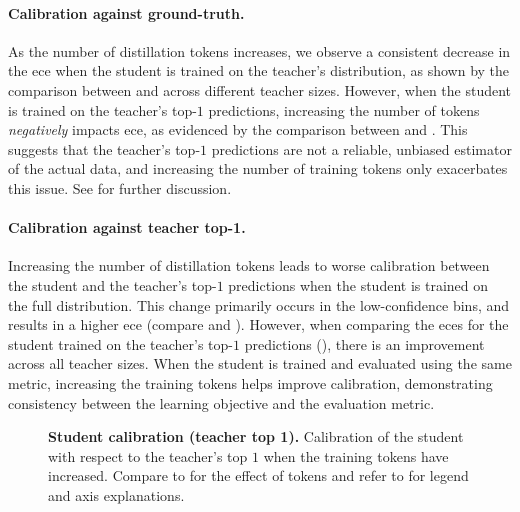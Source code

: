 \paragraph{Calibration against ground-truth.} 
As the number of distillation tokens increases, we observe a consistent decrease in the \gls{ece} when the student is trained on the teacher's distribution, as shown by the comparison between  and  across different teacher sizes. 
However, when the student is trained on the teacher's top-$1$ predictions, increasing the number of tokens \emph{negatively} impacts \gls{ece}, as evidenced by the comparison between  and . 
This suggests that the teacher's top-$1$ predictions are not a reliable, unbiased estimator of the actual data, and increasing the number of training tokens only exacerbates this issue. See  for further discussion.

\paragraph{Calibration against teacher top-1.} 
Increasing the number of distillation tokens leads to worse calibration between the student and the teacher's top-$1$ predictions when the student is trained on the full distribution. 
This change primarily occurs in the low-confidence bins, and results in a higher \gls{ece} (compare  and ). 
However, when comparing the \gls{ece}s for the student trained on the teacher's top-$1$ predictions (), there is an improvement across all teacher sizes. 
When the student is trained and evaluated using the same metric, increasing the training tokens helps improve calibration, demonstrating consistency between the learning objective and the evaluation metric.

\begin{figure}[h]
  \centering
  \hfill
  \caption{\textbf{Student calibration (teacher top 1).} Calibration of the student with respect to the teacher's top $1$ when the training tokens have increased. Compare to  for the effect of tokens and refer to  for legend and axis explanations.}
  \label{fig:calibration-student-ttop1-128b}
\end{figure}

